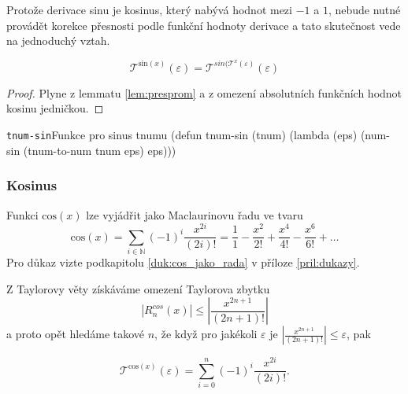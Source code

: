 Protože derivace sinu je kosinus, který nabývá hodnot mezi $-1$ a $1$, nebude nutné provádět korekce přesnosti podle funkční hodnoty derivace a tato skutečnost vede na jednoduchý vztah.

\begin{lemma}
\begin{equation}
\mathcal{T}^{\mathrm{sin}(x)}(\varepsilon)=\mathcal{T}^{sin(\mathcal{T}^x(\varepsilon)}(\varepsilon)
\end{equation}
\begin{proof}
Plyne z lemmatu \ref{lem:presprom} a z omezení absolutních funkčních hodnot kosinu jedničkou.
\end{proof}
\end{lemma}

\begin{lispcode}{\texttt{tnum-sin}}{Funkce pro sinus tnumu}
(\textcolor{funkcionalni}{defun} \textcolor{pojmenovan}{tnum-sin} (tnum)
  (\textcolor{funkcionalni}{lambda} (eps)
    (\textcolor{moje}{num-sin} (\textcolor{moje}{tnum-to-num} tnum eps) eps)))
\end{lispcode}

\subsubsection{Kosinus}
\begin{fact}\label{vet:cos_jako_rada}
Funkci $\mathrm{cos}(x)$ lze vyjádřit jako Maclaurinovu řadu ve tvaru
\begin{equation}
\mathrm{cos}(x) = \sum_{i\in\mathbb{N}}(-1)^i \frac{x^{2i}}{(2i)!} = \frac{1}{1} - \frac{x^2}{2!} + \frac{x^4}{4!} - \frac{x^6}{6!} + \ldots
\end{equation}
Pro důkaz vizte podkapitolu \ref{duk:cos_jako_rada} v příloze \ref{pril:dukazy}.
\end{fact}

Z Taylorovy věty získáváme omezení Taylorova zbytku
\begin{equation}
|R^{cos}_n(x)|\leq\left|\frac{x^{2n+1}}{(2n+1)!}\right|
\end{equation}
a proto opět hledáme takové $n$, že když pro jakékoli $\varepsilon$ je $|\frac{x^{2n+1}}{(2n+1)!}|\leq\varepsilon$, pak 
\begin{consequence}
\begin{equation}
\mathcal{T}^{\mathrm{cos}(x)}(\varepsilon)=\sum_{i=0}^n(-1)^i \frac{x^{2i}}{(2i)!}.
\end{equation}
\end{consequence}

